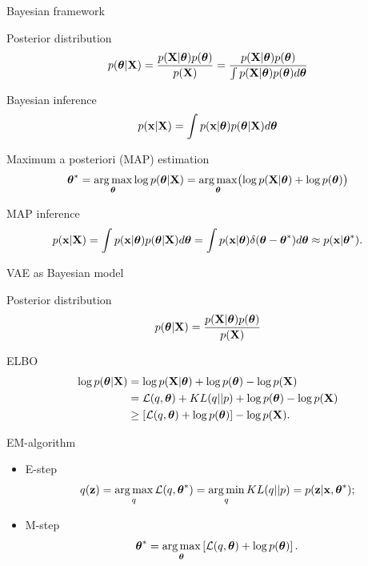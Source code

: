 \begin{frame}{Bayesian framework}
	\begin{block}{Posterior distribution}
		\vspace{-0.2cm}
		\[
			p(\boldsymbol{\theta} | \mathbf{X}) = \frac{p(\mathbf{X} | \boldsymbol{\theta}) p(\boldsymbol{\theta})}{p(\mathbf{X})} = \frac{p(\mathbf{X} | \boldsymbol{\theta}) p(\boldsymbol{\theta})}{\int p(\mathbf{X} | \boldsymbol{\theta}) p(\boldsymbol{\theta}) d \boldsymbol{\theta}} 
		\]
		\vspace{-0.2cm}
	\end{block}
	\begin{block}{Bayesian inference}
		\vspace{-0.3cm}
		\[
			p(\mathbf{x} | \mathbf{X}) = \int p(\mathbf{x} | \boldsymbol{\theta}) p(\boldsymbol{\theta} | \mathbf{X}) d \boldsymbol{\theta}
		\]
	\end{block}
    \begin{block}{Maximum a posteriori (MAP) estimation}
	    \vspace{-0.3cm}
	    \[
	        \boldsymbol{\theta}^* = \operatorname*{arg\,max}_{\boldsymbol{\theta}} \log p(\boldsymbol{\theta} | \mathbf{X}) = \operatorname*{arg\,max}_{\boldsymbol{\theta}} \bigl(\log p(\mathbf{X} | \boldsymbol{\theta}) + \log p(\boldsymbol{\theta}) \bigr)
	    \]
        \vspace{-0.3cm}
    \end{block}
	\begin{block}{MAP inference}
		\vspace{-0.4cm}
		\[
			p(\mathbf{x} | \mathbf{X}) = \int p(\mathbf{x}| \boldsymbol{\theta}) p(\boldsymbol{\theta} | \mathbf{X} ) d \boldsymbol{\theta} =  \int p(\mathbf{x}| \boldsymbol{\theta}) \delta (\boldsymbol{\theta} - \boldsymbol{\theta}^* ) d \boldsymbol{\theta} \approx p(\mathbf{x} | \boldsymbol{\theta}^*).
		\]
	\end{block}
\end{frame}
\begin{frame}{VAE as Bayesian model}
	\begin{block}{Posterior distribution}
		\vspace{-0.2cm}
		\[
			p(\boldsymbol{\theta} | \mathbf{X}) = \frac{p(\mathbf{X} | \boldsymbol{\theta}) p(\boldsymbol{\theta})}{p(\mathbf{X})}
		\]
		\vspace{-0.5cm}
	\end{block}
	\begin{block}{ELBO}
		\vspace{-0.5cm}
		\begin{align*}
			 \log p(\boldsymbol{\theta} | \mathbf{X}) &= \log p(\mathbf{X} | \boldsymbol{\theta}) + \log p(\boldsymbol{\theta}) - \log p(\mathbf{X}) \\
			 &= \mathcal{L}(q, \boldsymbol{\theta}) + KL(q || p) + \log p(\boldsymbol{\theta}) - \log p(\mathbf{X}) \\
			 &\geq \left[ \mathcal{L}(q, \boldsymbol{\theta}) + \log p(\boldsymbol{\theta}) \right] - \log p(\mathbf{X}) .
		\end{align*}
		\vspace{-0.7cm}
	\end{block}
	\begin{block}{EM-algorithm}
		\begin{itemize}
			\item E-step
				\vspace{-0.2cm}
				\[
					q(\mathbf{z}) = \operatorname*{arg\,max}_q \mathcal{L} (q, \boldsymbol{\theta}^*) = \operatorname*{arg\,min}_q KL(q || p) =
				 p(\mathbf{z}| \mathbf{x}, \boldsymbol{\theta}^*);
				\]
				\vspace{-0.5cm}
			\item M-step
				\[
					\boldsymbol{\theta}^* = \operatorname*{arg\,max}_{\boldsymbol{\theta}} \left[ \mathcal{L} (q, \boldsymbol{\theta}) + \log p(\boldsymbol{\theta}) \right].
				\]
		\end{itemize}
	\end{block}
\end{frame}
